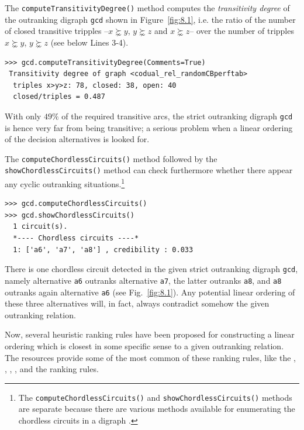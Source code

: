 The \texttt{computeTransitivityDegree()} method computes the \emph{transitivity degree} of the outranking digraph \texttt{gcd} shown in Figure~\vref{fig:8.1}, i.e. the ratio of the number of closed transitive tripples --$x \succnsim y$, $y \succnsim z$ and $x \succnsim z$-- over the number of tripples $x \succnsim y$, $y \succnsim z$ (see below Lines 3-4).
\begin{lstlisting}
>>> gcd.computeTransitivityDegree(Comments=True)
 Transitivity degree of graph <codual_rel_randomCBperftab>
  triples x>y>z: 78, closed: 38, open: 40
  closed/triples = 0.487
\end{lstlisting}    

With only $49\%$ of the required transitive arcs, the strict outranking digraph \texttt{gcd} is hence very far from being transitive; a serious problem when a linear ordering of the decision alternatives is looked for.

The \texttt{computeChordlessCircuits()} method followed by the \texttt{showChord\-lessCircuits()} method can check furthermore whether there appear any cyclic outranking situations.\footnote{The \texttt{computeChordlessCircuits()} and \texttt{showChordlessCircuits()} methods are separate because there are various methods available for enumerating the chordless circuits in a digraph \citep{BIS-2010}.}
\begin{lstlisting}
>>> gcd.computeChordlessCircuits()
>>> gcd.showChordlessCircuits()
  1 circuit(s).
  *---- Chordless circuits ----*    
  1: ['a6', 'a7', 'a8'] , credibility : 0.033
\end{lstlisting}

There is one chordless circuit detected in the given strict outranking digraph \texttt{gcd}, namely alternative \texttt{a6} outranks alternative \texttt{a7}, the latter outranks \texttt{a8}, and \texttt{a8} outranks again alternative \texttt{a6} (see Fig.~\vref{fig:8.1}). Any potential linear ordering of these three alternatives will, in fact, always contradict somehow the given outranking relation.

Now, several heuristic ranking rules have been proposed for constructing a linear ordering which is closest in some specific sense to a given outranking relation. The \Digraph resources provide some of the most common of these ranking rules, like the \Copeland, \Kemeny, \Slater, \Kohler, and the \RankedPairs ranking rules.

